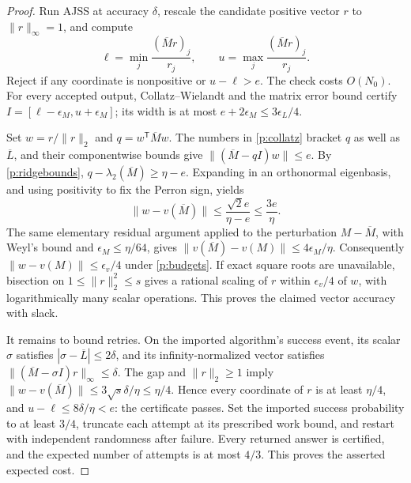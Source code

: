 \documentclass[11pt]{amsart}
\theoremstyle{definition}\newtheorem{definition}[theorem]{Definition}
\theoremstyle{remark}\newtheorem{remark}[theorem]{Remark}
\numberwithin{equation}{section}
\begin{document}
\begin{proof}
Run AJSS at accuracy $\delta$, rescale the candidate positive vector $r$
to $\|r\|_\infty=1$, and compute
\begin{equation}\label{p:collatz}
 \ell=\min_j\frac{(\overline Mr)_j}{r_j},\qquad
 u=\max_j\frac{(\overline Mr)_j}{r_j}.
\end{equation}
Reject if any coordinate is nonpositive or $u-\ell>e$.  The check costs
$O(N_0)$.  For every accepted output, Collatz--Wielandt and the matrix
error bound certify
$I=[\ell-\epsilon_M,u+\epsilon_M]$; its width is at most
$e+2\epsilon_M\le3\epsilon_L/4$.

Set $w=r/\|r\|_2$ and $q=w^{\mathsf T}\overline Mw$.  The numbers in
\eqref{p:collatz} bracket $q$ as well as $\overline L$, and their
componentwise bounds give
$\|(\overline M-qI)w\|\le e$.  By \eqref{p:ridgebounds},
$q-\lambda_2(\overline M)\ge\eta-e$.  Expanding in an orthonormal
eigenbasis, and using positivity to fix the Perron sign, yields
\[
 \|w-v(\overline M)\|
 \le\frac{\sqrt2e}{\eta-e}\le\frac{3e}{\eta}.
\]
The same elementary residual argument applied to the perturbation
$M-\overline M$, with Weyl's bound and $\epsilon_M\le\eta/64$, gives
$\|v(\overline M)-v(M)\|\le4\epsilon_M/\eta$.
Consequently $\|w-v(M)\|\le\epsilon_v/4$ under
\eqref{p:budgets}.  If exact square roots are unavailable, bisection on
$1\le\|r\|_2^2\le s$ gives a rational scaling of $r$ within
$\epsilon_v/4$ of $w$, with logarithmically many scalar operations.
This proves the claimed vector accuracy with slack.

It remains to bound retries.  On the imported algorithm's success event,
its scalar $\sigma$ satisfies $|\sigma-\overline L|\le2\delta$, and its
infinity-normalized vector satisfies
$\|(\overline M-\sigma I)r\|_\infty\le\delta$.
The gap and $\|r\|_2\ge1$ imply
$\|w-v(\overline M)\|\le3\sqrt{s}\delta/\eta\le\eta/4$.
Hence every coordinate of $r$ is at least $\eta/4$, and
$u-\ell\le8\delta/\eta<e$: the certificate passes.
Set the imported success probability to at least $3/4$, truncate each
attempt at its prescribed work bound, and restart with independent
randomness after failure.  Every returned answer is certified, and the
expected number of attempts is at most $4/3$.  This proves the asserted
expected cost.
\end{proof}
\end{document}
